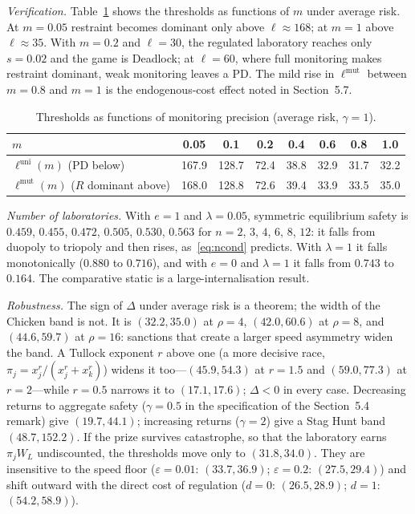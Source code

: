 \documentclass[11pt]{article}
\theoremstyle{plain}
\theoremstyle{definition}
\theoremstyle{remark}
\newcommand{\WL}{W_{\!L}}
\newcommand{\Delt}{\Delta}
\begin{document}
\emph{Verification.} Table~\ref{tab:m} shows the thresholds as functions of $m$ under average risk. At $m=0.05$ restraint becomes dominant only above $\ell\approx168$; at $m=1$ above $\ell\approx35$. With $m=0.2$ and $\ell=30$, the regulated laboratory reaches only $s=0.02$ and the game is Deadlock; at $\ell=60$, where full monitoring makes restraint dominant, weak monitoring leaves a PD. The mild rise in $\ell^{\mathrm{mut}}$ between $m=0.8$ and $m=1$ is the endogenous-cost effect noted in Section~5.7.

\begin{table}[t]\centering\small
\caption{Thresholds as functions of monitoring precision (average risk, $\gamma=1$).}
\label{tab:m}
\begin{tabular}{l ccccccc}
\toprule
$m$ & 0.05 & 0.1 & 0.2 & 0.4 & 0.6 & 0.8 & 1.0\\
\midrule
$\ell^{\mathrm{uni}}(m)$ (PD below) & 167.9 & 128.7 & 72.4 & 38.8 & 32.9 & 31.7 & 32.2\\
$\ell^{\mathrm{mut}}(m)$ ($R$ dominant above) & 168.0 & 128.8 & 72.6 & 39.4 & 33.9 & 33.5 & 35.0\\
\bottomrule
\end{tabular}
\end{table}

\emph{Number of laboratories.} With $e=1$ and $\lambda=0.05$, symmetric equilibrium safety is $0.459$, $0.455$, $0.472$, $0.505$, $0.530$, $0.563$ for $n=2$, $3$, $4$, $6$, $8$, $12$: it falls from duopoly to triopoly and then rises, as~\eqref{eq:ncond} predicts. With $\lambda=1$ it falls monotonically ($0.880$ to $0.716$), and with $e=0$ and $\lambda=1$ it falls from $0.743$ to $0.164$. The \citet{armstrong2016} comparative static is a large-internalisation result.

\emph{Robustness.} The sign of $\Delt$ under average risk is a theorem; the width of the Chicken band is not. It is $(32.2,35.0)$ at $\rho=4$, $(42.0,60.6)$ at $\rho=8$, and $(44.6,59.7)$ at $\rho=16$: sanctions that create a larger speed asymmetry widen the band. A Tullock exponent $r$ above one (a more decisive race, $\pi_j=x_j^r/(x_j^r+x_k^r)$) widens it too---$(45.9,54.3)$ at $r=1.5$ and $(59.0,77.3)$ at $r=2$---while $r=0.5$ narrows it to $(17.1,17.6)$; $\Delt<0$ in every case. Decreasing returns to aggregate safety ($\gamma=0.5$ in the specification of the Section~5.4 remark) give $(19.7,44.1)$; increasing returns ($\gamma=2$) give a Stag Hunt band $(48.7,152.2)$. If the prize survives catastrophe, so that the laboratory earns $\pi_j\WL$ undiscounted, the thresholds move only to $(31.8,34.0)$. They are insensitive to the speed floor ($\varepsilon=0.01$: $(33.7,36.9)$; $\varepsilon=0.2$: $(27.5,29.4)$) and shift outward with the direct cost of regulation ($d=0$: $(26.5,28.9)$; $d=1$: $(54.2,58.9)$).
\end{document}

